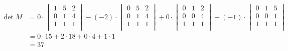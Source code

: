 \documentclass[a4paper,10pt,DIV=14]{scrartcl}
\begin{document}
\begin{align*}
	\det M & = 0 \cdot	\begin{vmatrix}
							1 & 5 & 2 \\
							0 & 1 & 4 \\
							1 & 1 & 1 \\
						\end{vmatrix}
		 - (-2) \cdot	\begin{vmatrix}
						 	0 & 5 & 2 \\
						 	0 & 1 & 4 \\
						 	1 & 1 & 1 \\
						\end{vmatrix}
		 + 0 \cdot		\begin{vmatrix}
						 	0 & 1 & 2 \\
						 	0 & 0 & 4 \\
						 	1 & 1 & 1 \\
						\end{vmatrix}
		 - (-1) \cdot	\begin{vmatrix}
		 					0 & 1 & 5 \\
		 					0 & 0 & 1 \\
		 					1 & 1 & 1 \\
						\end{vmatrix} \\
	       & = 0 \cdot 15 + 2 \cdot 18 + 0 \cdot 4 + 1 \cdot 1 \\
	       & = 37
\end{align*}
\end{document}
